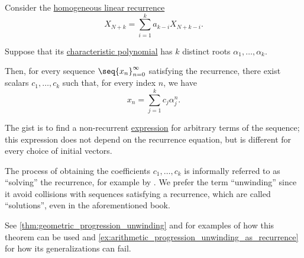 \begin{theorem}\label{thm:linear_recurrence_unwinding}
  Consider the \hyperref[def:homogeneous_linear_recurrence]{homogeneous linear recurrence}
  \begin{equation*}
    X_{N+k} = \sum_{i=1}^k a_{k-i} X_{N+k-i}.
  \end{equation*}

  Suppose that its \hyperref[def:linear_recurrence_characteristic_polynomial]{characteristic polynomial} has \( k \) distinct roots \( \alpha_1, \ldots, \alpha_k \).

  Then, for every sequence \( \seq{ x_n }_{n=0}^\infty \) satisfying the recurrence, there exist scalars \( c_1, \ldots, c_k \) such that, for every index \( n \), we have
  \begin{equation}\label{eq:thm:linear_recurrence_unwinding}
    x_n = \sum_{j=1}^k c_j \alpha_j^n.
  \end{equation}
\end{theorem}
\begin{comments}
  \item The gist is to find a non-recurrent \hyperref[con:expression]{expression} for arbitrary terms of the sequence; this expression does not depend on the recurrence equation, but is different for every choice of initial vectors.

  \item The process of obtaining the coefficients \( c_1, \ldots, c_k \) is informally referred to as \enquote{solving} the recurrence, for example by \textcite[\S 8.2]{Rosen2019DiscreteMathematics}. We prefer the term \enquote{unwinding} since it avoid collisions with sequences satisfying a recurrence, which are called \enquote{solutions}, even in the aforementioned book.

  \item See \cref{thm:geometric_progression_unwinding} and  for examples of how this theorem can be used and \cref{ex:arithmetic_progression_unwinding_as_recurrence} for how its generalizations can fail.
\end{comments}
